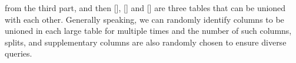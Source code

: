   \textcolor{green}{} from the third part, and then
  [],
  [\textcolor{red}{}\textcolor{red}{}\textcolor{red}{}\textcolor{red}{}\textcolor{red}{}]
   and
  [\textcolor{green}{}\textcolor{green}{}\textcolor{green}{}\textcolor{green}{}] are three tables that can be unioned with each other. 
  Generally speaking, we can randomly identify columns to be unioned in  each large table  for multiple times and the number of such columns, splits, and supplementary columns are also randomly chosen to ensure diverse queries. 
  
  
  
  
